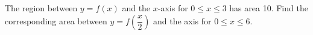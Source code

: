 The region between $ y=f(x)$ and the $ x $-axis for $ 0\le x\le3 $ has area 10. Find the corresponding area between $ y=f(\dfrac{x}{2})$ and the axis for $ 0\le x\le6 $.
